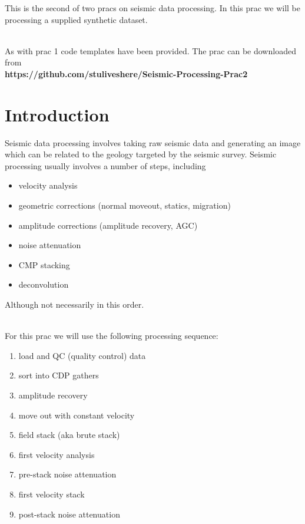 

\maketitle %
This is the second of two pracs on seismic data processing.  In this prac we will be processing a supplied synthetic dataset.
\par~\\
As with prac 1 code templates have been provided. The prac can be downloaded from  \\ \textbf{https://github.com/stuliveshere/Seismic-Processing-Prac2}

\section{Introduction}
Seismic data processing involves taking raw seismic data and generating an image which can be related to the geology targeted by the seismic survey.  Seismic processing usually involves a number of steps, including
\begin{itemize}
\item velocity analysis
\item geometric corrections (normal moveout,  statics, migration)
\item amplitude corrections (amplitude recovery, AGC)
\item noise attenuation
\item CMP stacking
\item deconvolution
\end{itemize}
Although not necessarily in this order.
\par~\\
For this prac we will use the following processing sequence:
\begin{enumerate}
\item load and QC (quality control) data
\item sort into CDP gathers
\item amplitude recovery
\item move out with constant velocity
\item field stack (aka brute stack)
\item first velocity analysis
\item pre-stack noise attenuation
\item first velocity stack
\item post-stack noise attenuation
\end{enumerate}
